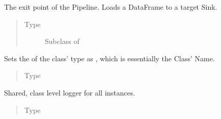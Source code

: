 \documentclass[a4paper,10pt, twoside,english]{sphinxmanual}
\begin{document}
\begin{fulllineitems}
\begin{fulllineitems}
\label{\detokenize{pipeline/pipeline:spooq2.pipeline.pipeline.Pipeline.loader}}
The exit point of the Pipeline. Loads a DataFrame to a target Sink.
\begin{quote}\begin{description}
\item[{Type}] \leavevmode
Subclass of 

\end{description}\end{quote}

\end{fulllineitems}


\begin{fulllineitems}
\label{\detokenize{pipeline/pipeline:spooq2.pipeline.pipeline.Pipeline.name}}
Sets the  of the class’ type as , which is essentially the Class’ Name.
\begin{quote}\begin{description}
\item[{Type}] \leavevmode
{}

\end{description}\end{quote}

\end{fulllineitems}


\begin{fulllineitems}
\label{\detokenize{pipeline/pipeline:spooq2.pipeline.pipeline.Pipeline.logger}}
Shared, class level logger for all instances.
\begin{quote}\begin{description}
\item[{Type}] \leavevmode
{}

\end{description}\end{quote}


\end{fulllineitems}
\end{fulllineitems}
\end{document}
